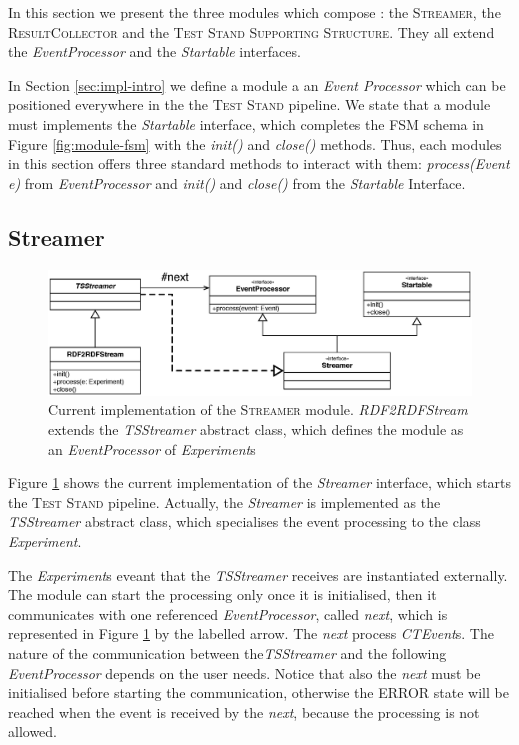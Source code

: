 In this section we present the three modules which compose \name: the \textsc{Streamer},  the \textsc{ResultCollector} and the  \textsc{Test Stand Supporting Structure}. They all extend the \textit{EventProcessor} and the \textit{Startable} interfaces.

In Section \ref{sec:impl-intro} we define a module a an \textit{Event Processor} which can be positioned everywhere in the the \textsc{Test Stand} pipeline. We state that a module must implements the \textit{Startable} interface, which completes the FSM schema in Figure \ref{fig:module-fsm} with the \textit{init()} and \textit{close()} methods.
Thus, each modules in this section offers three standard methods to interact with them: \textit{process(Event e)} from \textit{EventProcessor} and \textit{init()} and \textit{close()} from the \textit{Startable} Interface.

\subsection{Streamer}	\label{sec:streamer-impl}
\begin{figure}[tbh]
  \centering
	\includegraphics[width=\linewidth]{images/uml_tstreamer}
	\caption[\textit{RDF2RDFStream \textsc{Streamer} Implementation} - UML Schema]{Current implementation of the \textsc{Streamer} module. \textit{RDF2RDFStream} extends the \textit{TSStreamer} abstract class, which defines the module as an \textit{EventProcessor} of \textit{Experiment}s} 
  	\label{fig:uml_tstreamer}
\end{figure}

\noindent Figure \ref{fig:uml_tstreamer} shows the current implementation of the \textit{Streamer} interface, which starts the \textsc{Test Stand} pipeline. Actually, the \textit{Streamer} is implemented as the \textit{TSStreamer} abstract class, which specialises the event processing to the class \textit{Experiment}. 

The \textit{Experiment}s eveant that the \textit{TSStreamer} receives are instantiated externally. The module can start the processing only once it is initialised, then it communicates with one referenced \textit{EventProcessor}, called \textit{next}, which is represented in Figure \ref{fig:uml_tstreamer} by the labelled arrow. The \textit{next} process \textit{CTEvent}s. The nature of the communication between the\textit{TSStreamer} and the following \textit{EventProcessor} depends on the user needs. Notice that also the \textit{next} must be initialised before starting the communication, otherwise the ERROR state will be reached when the event is received by the \textit{next}, because the processing is not allowed.

